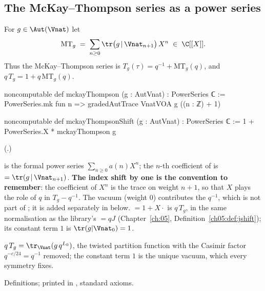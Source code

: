 \subsection{The McKay--Thompson series as a power series}

\begin{definition}\label{ch16:def:mckayThompson}
For $g\in\Aut(\Vnat)$ let
\begin{equation*}
  \mathrm{MT}_g \;=\;\sum_{n\ge0}\tr\bigl(g\,|\,\Vnat_{n+1}\bigr)\,X^n\;\in\;\C[[X]] .
\end{equation*}
Thus the McKay--Thompson series is $T_g(\tau)=q^{-1}+\mathrm{MT}_g(q)$, and $q\,T_g=1+q\,\mathrm{MT}_g(q)$.
\end{definition}
\begin{leancode}
noncomputable def mckayThompson (g : AutVnat) : PowerSeries ℂ :=
  PowerSeries.mk fun n => gradedAutTrace VnatVOA g ((n : ℤ) + 1)

noncomputable def mckayThompsonShift (g : AutVnat) : PowerSeries ℂ :=
  1 + PowerSeries.X * mckayThompson g
\end{leancode}
(.)
\begin{dictionary}
 is the formal power series $\sum_{n\ge0}a(n)X^n$; the $n$-th coefficient of
 is  $=\tr(g\,|\,\Vnat_{n+1})$.  \textbf{The index
shift by one is the convention to remember}: the coefficient of $X^n$ is the trace on weight $n+1$, so that $X$
plays the role of $q$ in $T_g-q^{-1}$.  The vacuum (weight $0$) contributes the $q^{-1}$, which is not part of
; it is added separately in  below.  
$=1+X\cdot$ is $q\,T_g$, in the same normalisation as the library's 
$=qJ$ (Chapter~\ref{ch:05}, Definition~\ref{ch05:def:jshift}); its constant term $1$ is $\tr(g|\Vnat_0)=1$.
\end{dictionary}
\begin{physics}
$q\,T_g=\tr_{\Vnat}(g\,q^{L_0})$, the twisted partition function with the Casimir factor $q^{-c/24}=q^{-1}$ removed;
the constant term $1$ is the unique vacuum, which every symmetry fixes.
\end{physics}
\begin{status}
Definitions; printed in , standard axioms.
\end{status}

